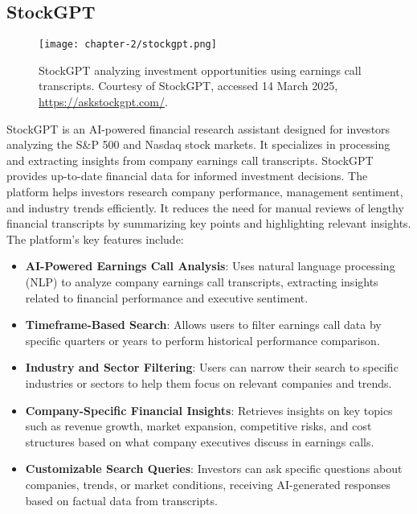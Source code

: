 \newpage

\subsection{StockGPT}
\label{subsection:stockgpt}

\begin{figure}[h]
    \centering
    \texttt{[image: chapter-2/stockgpt.png]}
    \caption[StockGPT analyzing investment opportunities]{StockGPT analyzing investment opportunities using earnings call transcripts. Courtesy of StockGPT, accessed 14 March 2025, \url{https://askstockgpt.com/}.}
    \label{fig:stockgpt}
\end{figure}

\FloatBarrier

StockGPT is an AI-powered financial research assistant designed for investors analyzing the S\&P 500 and Nasdaq stock markets. 
It specializes in processing and extracting insights from company earnings call transcripts. StockGPT provides up-to-date financial data for informed investment decisions. 
The platform helps investors research company performance, management sentiment, and industry trends efficiently. It reduces the need for manual reviews of lengthy financial 
transcripts by summarizing key points and highlighting relevant insights. The platform's key features include:

\begin{itemize}[leftmargin=60pt]
    \item \textbf{AI-Powered Earnings Call Analysis}: Uses natural language processing (NLP) to analyze company earnings call transcripts, extracting insights related to financial performance and executive sentiment.
    \item \textbf{Timeframe-Based Search}: Allows users to filter earnings call data by specific quarters or years to perform historical performance comparison.
    \item \textbf{Industry and Sector Filtering}: Users can narrow their search to specific industries or sectors to help them focus on relevant companies and trends.
    \item \textbf{Company-Specific Financial Insights}: Retrieves insights on key topics such as revenue growth, market expansion, competitive risks, and cost structures based on what company executives discuss in earnings calls.
    \item \textbf{Customizable Search Queries}: Investors can ask specific questions about companies, trends, or market conditions, receiving AI-generated responses based on factual data from transcripts.
\end{itemize}

